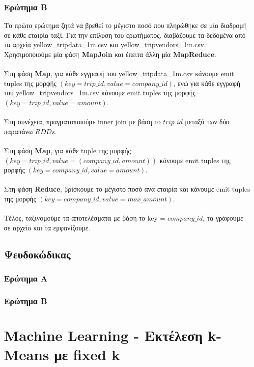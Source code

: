 \documentclass{ntua}
\begin{document}
\subsubsection{Ερώτημα Β}
Το πρώτο ερώτημα ζητά να βρεθεί το μέγιστο ποσό που πληρώθηκε σε μία διαδρομή σε κάθε εταιρία ταξί. Για την επίλυση του ερωτήματος, διαβάζουμε τα δεδομένα από τα αρχεία yellow\_tripdata\_1m.csv και yellow\_tripvendors\_1m.csv. Χρησιμοποιούμε μία φάση \textbf{MapJoin} και έπειτα άλλη μία \textbf{MapReduce}. \\ \\ 
Στη φάση \textbf{Map}, για κάθε εγγραφή του yellow\_tripdata\_1m.csv κάνουμε emit tuples της μορφής $( key = trip\_id, value = company\_id)$, ενώ για κάθε εγγραφή του yellow\_tripvendors\_1m.csv κάνουμε emit tuples της μορφής $( key = trip\_id, value = amount)$. \\ \\
Στη συνέχεια, πραγματοποιούμε inner join με βάση το $trip\_id$ μεταξύ των δύο παραπάνω $RDDs$.\\ \\ 
Στη φάση \textbf{Map}, για κάθε tuple της μορφής$( key = trip\_id, value = (company\_id,amount))$ κάνουμε emit tuples της μορφής $( key = company\_id, value = amount)$.  \\ \\
Στη φάση \textbf{Reduce}, βρίσκουμε το μέγιστο ποσό ανά εταιρία και κάνουμε emit tuples της μορφής $( key = company\_id, value = max\_amount)$. \\ \\
Τέλος, ταξινομούμε τα αποτελέσματα με βάση το key = $company\_id$, τα γράφουμε σε αρχείο και τα εμφανίζουμε.
\subsection{Ψευδοκώδικας}

\subsubsection{Ερώτημα Α}

\subsubsection{Ερώτημα Β}

\newpage

\section{Machine Learning - Εκτέλεση k-Means με fixed k}
\end{document}
